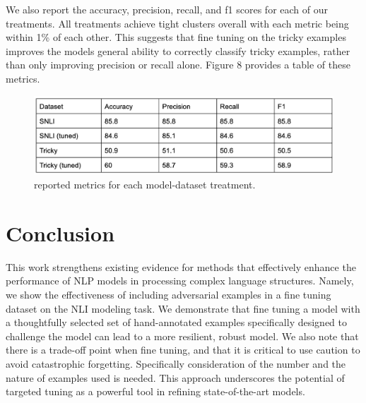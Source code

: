 \documentclass{article}
\begin{document}
\newpage
We also report the accuracy, precision, recall, and f1 scores for each of our treatments. All treatments achieve tight
clusters overall with each metric being within 1\% of each other. This suggests that fine tuning on the tricky examples
improves the models general ability to correctly classify tricky examples, rather than only improving precision or recall
alone. Figure 8 provides a table of these metrics.

\begin{figure}[!h]
	\centering
	\includegraphics[width=\linewidth]{figures/nlp_final_project_metrics.png}
	\caption{reported metrics for each model-dataset treatment.}
\end{figure}

\section{Conclusion}

This work strengthens existing evidence for methods that effectively enhance the performance of NLP models in processing
complex language structures. Namely, we show the effectiveness of including adversarial examples in a fine tuning dataset
on the NLI modeling task. We demonstrate that fine tuning a model with a thoughtfully selected set of hand-annotated examples
specifically designed to challenge the model can lead to a more resilient, robust model. We also note that there is
a trade-off point when fine tuning, and that it is critical to use caution to avoid catastrophic forgetting. Specifically
consideration of the number and the nature of examples used is needed. This approach underscores the potential of targeted
tuning as a powerful tool in refining state-of-the-art models.



\end{document}
